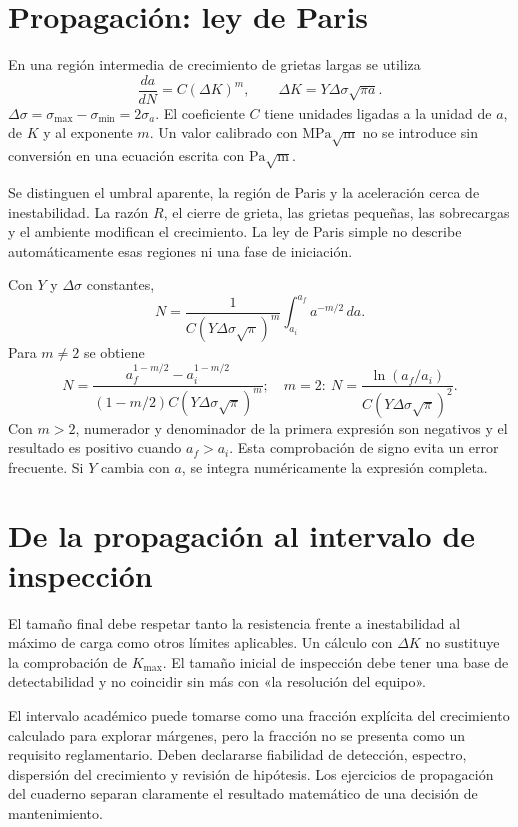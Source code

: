 \section{Propagación: ley de Paris}
En una región intermedia de crecimiento de grietas largas se utiliza
\begin{equation}\frac{da}{dN}=C(\Delta K)^m,\qquad\Delta K=Y\Delta\sigma\sqrt{\pi a}.\label{eq:paris}\end{equation}
$\Delta\sigma=\sigma_{\max}-\sigma_{\min}=2\sigma_a$. El coeficiente $C$ tiene unidades ligadas a la unidad de $a$, de $K$ y al exponente $m$. Un valor calibrado con $\mathrm{MPa\sqrt m}$ no se introduce sin conversión en una ecuación escrita con $\mathrm{Pa\sqrt m}$.

Se distinguen el umbral aparente, la región de Paris y la aceleración cerca de inestabilidad. La razón $R$, el cierre de grieta, las grietas pequeñas, las sobrecargas y el ambiente modifican el crecimiento. La ley de Paris simple no describe automáticamente esas regiones ni una fase de iniciación.

Con $Y$ y $\Delta\sigma$ constantes,
\begin{equation}N=\frac{1}{C(Y\Delta\sigma\sqrt\pi)^m}\int_{a_i}^{a_f}a^{-m/2}\,da.\label{eq:parisint}\end{equation}
Para $m\ne2$ se obtiene
\begin{equation}N=\frac{a_f^{1-m/2}-a_i^{1-m/2}}{(1-m/2)C(Y\Delta\sigma\sqrt\pi)^m};\quad m=2:\ N=\frac{\ln(a_f/a_i)}{C(Y\Delta\sigma\sqrt\pi)^2}.\label{eq:parisclosed}\end{equation}
Con $m>2$, numerador y denominador de la primera expresión son negativos y el resultado es positivo cuando $a_f>a_i$. Esta comprobación de signo evita un error frecuente. Si $Y$ cambia con $a$, se integra numéricamente la expresión completa.
\section{De la propagación al intervalo de inspección}
El tamaño final debe respetar tanto la resistencia frente a inestabilidad al máximo de carga como otros límites aplicables. Un cálculo con $\Delta K$ no sustituye la comprobación de $K_{\max}$. El tamaño inicial de inspección debe tener una base de detectabilidad y no coincidir sin más con «la resolución del equipo».

El intervalo académico puede tomarse como una fracción explícita del crecimiento calculado para explorar márgenes, pero la fracción no se presenta como un requisito reglamentario. Deben declararse fiabilidad de detección, espectro, dispersión del crecimiento y revisión de hipótesis. Los ejercicios de propagación del cuaderno separan claramente el resultado matemático de una decisión de mantenimiento.
